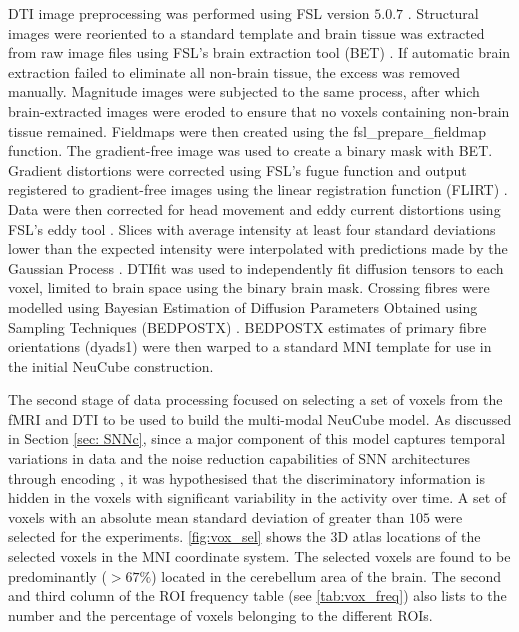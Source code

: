 DTI image preprocessing was performed using FSL version $5.0.7$ \citep{smith2004advances}. Structural images were reoriented to a standard template and brain tissue was extracted from raw image files using FSL’s brain extraction tool (BET) \citep{smith2002fast}. If automatic brain extraction failed to eliminate all non-brain tissue, the excess was removed manually. Magnitude images were subjected to the same process, after which brain-extracted images were eroded to ensure that no voxels containing non-brain tissue remained. Fieldmaps were then created using the fsl\_prepare\_fieldmap function. The gradient-free image was used to create a binary mask with BET. Gradient distortions were corrected using FSL’s fugue function and output registered to gradient-free images using the linear registration function (FLIRT) \citep{jenkinson2001global}. Data were then corrected for head movement and eddy current distortions using FSL’s eddy tool \citep{andersson2016integrated}. Slices with average intensity at least four standard deviations lower than the expected intensity were interpolated with predictions made by the Gaussian Process \citep{andersson2016incorporating}. DTIfit was used to independently fit diffusion tensors to each voxel, limited to brain space using the binary brain mask. Crossing fibres were modelled using Bayesian Estimation of Diffusion Parameters Obtained using Sampling Techniques (BEDPOSTX) \citep{behrens2003characterization}. BEDPOSTX estimates of primary fibre orientations (dyads1) were then warped to a standard MNI template for use in the initial NeuCube construction.

The second stage of data processing focused on selecting a set of voxels from the fMRI and DTI to be used to build the multi-modal NeuCube model. As discussed in Section \ref{sec: SNNc}, since a major component of this model captures temporal variations in data and the noise reduction capabilities of SNN architectures through encoding \citep{kasabov2016evolving}, it was hypothesised that the discriminatory information is hidden in the voxels with significant variability in the activity over time. A set of voxels with an absolute mean standard deviation of greater than $105$ were selected for the experiments. \figurename \ref{fig:vox_sel} shows the 3D atlas locations of the selected voxels in the MNI coordinate system. The selected voxels are found to be predominantly ($>67\%$) located in the cerebellum area of the brain. The second and third column of the ROI frequency table (see \tablename \ref{tab:vox_freq}) also lists to the number and the percentage of voxels belonging to the different ROIs.  

